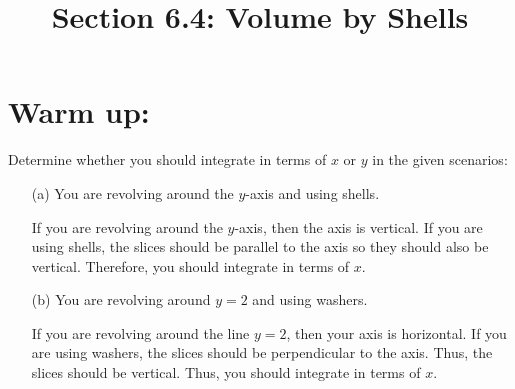 \documentclass[noinstructornotes]{ximera}
\title{Section 6.4: Volume by Shells}
\begin{document}
\begin{abstract}		\end{abstract}
\maketitle




\section{Warm up:}
\begin{problem}
Determine whether you should integrate in terms of $x$ or $y$ in the given scenarios:
\begin{itemize}

	\item[(a)] You are revolving around the $y$-axis and using shells.
	
	\begin{freeResponse}
	If you are revolving around the $y$-axis, then the axis is vertical.  If you are using shells, the slices should be parallel to the axis so they should also be vertical.  Therefore, you should integrate in terms of $x$.
	\end{freeResponse}
	
	\item[(b)] You are revolving around $y=2$ and using washers.

	\begin{freeResponse}
	If you are revolving around the line $y=2$, then your axis is horizontal.  If you are using washers, the slices should be perpendicular to the axis.  Thus, the slices should be vertical.  Thus, you should integrate in terms of $x$.
	\end{freeResponse}

\end{itemize}


\end{problem}

	
\end{document}
